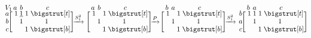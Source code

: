 \documentclass[sn-mathphys]{sn-jnl}
\begin{document}
\vspace{-1.8em}
$$
	\def\rowsp{0.2em}
	\def\arraystretch{0.95}
	\makeatletter\setlength\BA@colsep{1.2pt}\makeatother
	\begin{blockarray}{cccc}{V_1}
	\kern-0.2em \vspace{-0.3em} & a & b & c  \\
		\begin{block}{c[ccc]}
        a \kern\rowsp  & \; 1 &  \underline{1} & 1 \; \topstrut \\
  		b \kern\rowsp & \;  & 1 & 1 \; \\
  		c \kern\rowsp & \;  &  & 1 \; \botstrut \\
		\end{block}
	\end{blockarray}
	\xrightarrow{S_{1}^2} 
	\hspace{-0.1em}
	\, \,
	\begin{blockarray}{cccc}{}
	\kern-0.2em \vspace{-0.3em} & a & b & c  \\
		\begin{block}{c[ccc]}
  		 & \; 1 &  & 1 \; \topstrut \\
  		 & \;  & 1 & 1 \; \\
  		 & \;  &  & 1 \; \botstrut \\
		\end{block}
	\end{blockarray}
	\xrightarrow{P}
	\begin{blockarray}{cccc}{}
	\kern-0.2em \vspace{-0.3em} & b & a & c  \\
		\begin{block}{c[ccc]}
  		& \; 1 &  & 1 \; \topstrut \\
  		& \;  & 1 & 1 \; \\
  		& \;  &  & 1 \; \botstrut \\
		\end{block}
	\end{blockarray}
	\xrightarrow{S_1^2}
	\begin{blockarray}{cccc}{}
	\kern-0.2em \vspace{-0.3em} & b & a & c  \\
		\begin{block}{c[ccc]}
  		 b \kern\rowsp & \; 1 & 1 & 1 \; \topstrut \\
  		 a \kern\rowsp & \; & 1 & 1 \; \\
  		 c \kern\rowsp & \;  &  & 1 \; \botstrut \\
		\end{block}
	\end{blockarray}
$$
\end{document}
